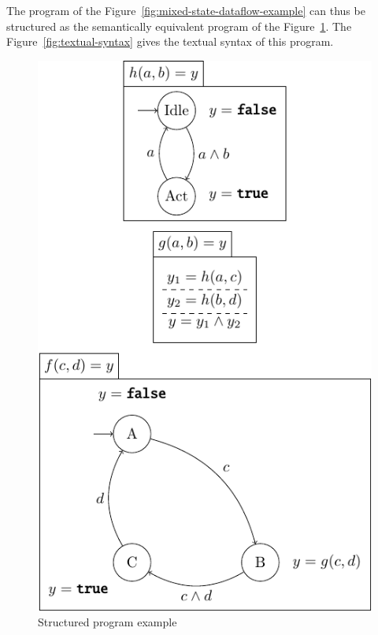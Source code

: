\documentclass[a4paper]{article}
\begin{document}
The program of the Figure~\ref{fig:mixed-state-dataflow-example} can thus be
structured as the semantically equivalent program of the
Figure~\ref{fig:struct-prog-example}. The Figure~\ref{fig:textual-syntax} gives
the textual syntax of this program.


\begin{figure}[htbp]
  \centering
  \includegraphics{figures/struct-pg}
  \caption{Structured program example}
  \label{fig:struct-prog-example}
\end{figure}
\end{document}
